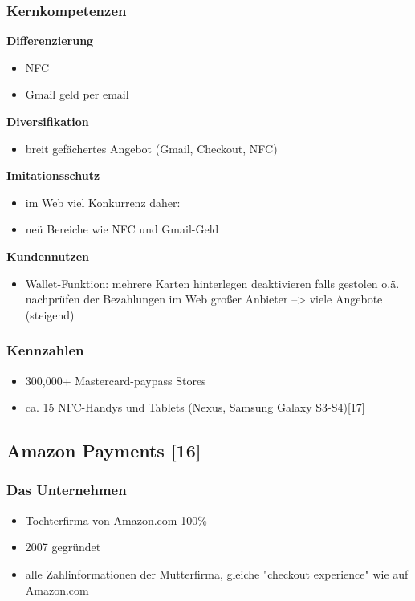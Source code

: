 \subsubsection{ Kernkompetenzen}
\textbf{Differenzierung}\\
	\begin{itemize}
	\item NFC
	\item Gmail geld per email
	\end{itemize}
\textbf{Diversifikation}\\
	\begin{itemize}
	\item breit gefächertes Angebot (Gmail, Checkout, NFC)
	\end{itemize}
\textbf{Imitationsschutz}\\
	\begin{itemize}
	\item im Web viel Konkurrenz daher:
	\item neü Bereiche wie NFC und Gmail-Geld
	\end{itemize}
\textbf{Kundennutzen}\\
	\begin{itemize}
	\item Wallet-Funktion: 
	\subitem  mehrere Karten hinterlegen
	\subitem  deaktivieren falls gestolen o.ä.
	\subitem  nachprüfen der Bezahlungen im Web
	\subitem  großer Anbieter --> viele Angebote (steigend)
	\end{itemize}

\subsubsection{ Kennzahlen}
	\begin{itemize}
	\item 300,000+ Mastercard-paypass Stores
	\item ca. 15 NFC-Handys und Tablets (Nexus, Samsung Galaxy S3-S4)[17]
	\end{itemize}




\subsection{ Amazon Payments [16]}
\subsubsection{ Das Unternehmen}
	\begin{itemize}
	\item Tochterfirma von Amazon.com 100\%
	\item 2007 gegründet
	\item alle Zahlinformationen der Mutterfirma, gleiche "checkout experience" wie auf Amazon.com
	\end{itemize}


